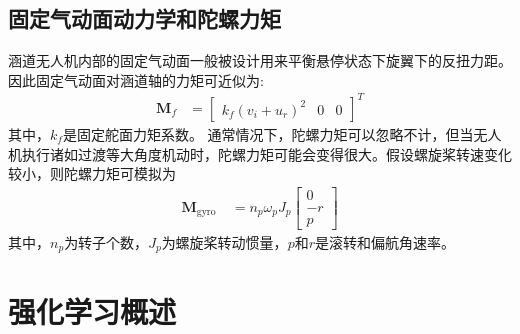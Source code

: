 \subsection{固定气动面动力学和陀螺力矩}
涵道无人机内部的固定气动面一般被设计用来平衡悬停状态下旋翼下的反扭力距。因此固定气动面对涵道轴的力矩可近似为:
\begin{align}
    \mathbf{M}_{f} & = \left[\begin{array}{lll}
    k_{f} (v_{i}+u_{r})^{2} & 0 & 0 
    \end{array}\right]^{T}
\end{align}
其中，$k_{f}$是固定舵面力矩系数。
通常情况下，陀螺力矩可以忽略不计，但当无人机执行诸如过渡等大角度机动时，陀螺力矩可能会变得很大。假设螺旋桨转速变化较小，则陀螺力矩可模拟为
\begin{align}
    \mathbf{M}_{\text {gyro }} & = n_{p} \omega_{p} J_{p}\left[\begin{array}{c}
    0 \\
    -r \\
    p
    \end{array}\right]
\end{align}
其中，$n_{p}$为转子个数，$J_{p}$为螺旋桨转动惯量，$p$和$r$是滚转和偏航角速率。

\section{强化学习概述}
